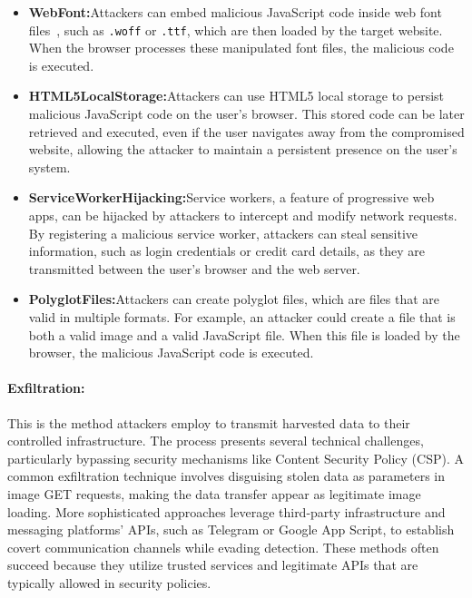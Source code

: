 \begin{itemize}
\item \textbf{Web\;Font:}\;Attackers can embed malicious JavaScript code inside web font files~\cite{martin2022woocommerce}, such as \texttt{.woff} or \texttt{.ttf}, which are then loaded by the target website. When the browser processes these manipulated font files, the malicious code is executed.

\item \textbf{HTML5\;Local\;Storage:}\;Attackers can use HTML5 local storage to persist malicious JavaScript code on the user's browser. This stored code can be later retrieved and executed, even if the user navigates away from the compromised website, allowing the attacker to maintain a persistent presence on the user's system.

\item \textbf{Service\;Worker\;Hijacking:}\;Service workers, a feature of progressive web apps, can be hijacked by attackers to intercept and modify network requests. By registering a malicious service worker, attackers can steal sensitive information, such as login credentials or credit card details, as they are transmitted between the user's browser and the web server.

\item \textbf{Polyglot\;Files:}\;Attackers can create polyglot files, which are files that are valid in multiple formats. For example, an attacker could create a file that is both a valid image and a valid JavaScript file. When this file is loaded by the browser, the malicious JavaScript code is executed.
\end{itemize}

\paragraph{Exfiltration:} This is the method attackers employ to transmit harvested data to their controlled infrastructure. The process presents several technical challenges, particularly bypassing security mechanisms like Content Security Policy (CSP). A common exfiltration technique involves disguising stolen data as parameters in image GET requests, making the data transfer appear as legitimate image loading. More sophisticated approaches leverage third-party infrastructure and messaging platforms' APIs, such as Telegram or Google App Script, to establish covert communication channels while evading detection. These methods often succeed because they utilize trusted services and legitimate APIs that are typically allowed in security policies.

